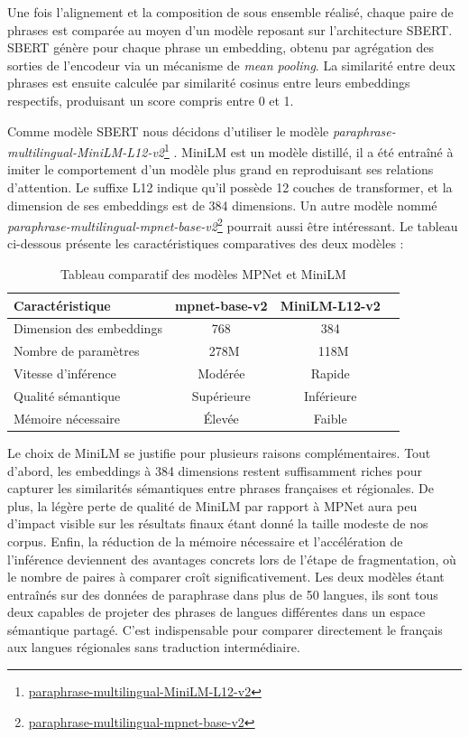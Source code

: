 Une fois l’alignement et la composition de sous ensemble réalisé, chaque paire de phrases est comparée au moyen d’un modèle reposant sur
l’architecture SBERT\citep{reimers_2019}. SBERT génère pour chaque phrase un embedding, obtenu
par agrégation des sorties de l'encodeur via un mécanisme de \textit{mean pooling}. La similarité entre
deux phrases est ensuite calculée par similarité cosinus entre leurs embeddings respectifs,
produisant un score compris entre 0 et 1.

Comme modèle SBERT nous décidons d'utiliser le modèle 
\textit{paraphrase-multilingual-MiniLM-L12-v2}\footnote{\href{https://huggingface.co/sentence-transformers/paraphrase-multilingual-MiniLM-L12-v2}{paraphrase-multilingual-MiniLM-L12-v2}} \citep{reimers_2019}.
MiniLM est un modèle distillé, il a été entraîné à imiter le comportement d'un modèle plus grand en 
reproduisant ses relations d'attention. Le suffixe L12 indique qu'il possède 12 couches de
transformer, et la dimension de ses embeddings est de 384 dimensions. Un autre modèle nommé 
\textit{paraphrase-multilingual-mpnet-base-v2}\footnote{\href{https://huggingface.co/sentence-transformers/paraphrase-multilingual-mpnet-base-v2}{paraphrase-multilingual-mpnet-base-v2}} \citep{reimers_2019}
pourrait aussi être intéressant. Le tableau ci-dessous présente les caractéristiques comparatives des deux modèles{ :}

\begin{table}[h!]
\centering
\begin{tabular}{lccc}
\hline
\textbf{Caractéristique} & \textbf{mpnet-base-v2} & \textbf{MiniLM-L12-v2} \\
\hline
Dimension des embeddings & 768 & 384 \\
Nombre de paramètres & ~278M & ~118M \\
Vitesse d'inférence & Modérée & Rapide \\
Qualité sémantique & Supérieure & Inférieure \\
Mémoire nécessaire & Élevée & Faible \\
\hline
\end{tabular}
\caption{Tableau comparatif des modèles MPNet et MiniLM}
\end{table}

Le choix de MiniLM se justifie pour plusieurs raisons complémentaires. Tout d'abord,
les embeddings à 384 dimensions restent suffisamment riches pour capturer les similarités sémantiques
entre phrases françaises et régionales. De plus, la légère perte de qualité de MiniLM par rapport à MPNet
aura peu d'impact visible sur les résultats finaux étant donné la taille modeste de nos corpus.
Enfin, la réduction de la mémoire nécessaire et l'accélération de l'inférence deviennent des avantages
concrets lors de l'étape de fragmentation, où le nombre de paires à comparer croît significativement.
Les deux modèles étant entraînés sur des données de paraphrase dans plus de 50 langues,
ils sont tous deux capables de projeter des phrases de langues différentes dans un espace sémantique partagé.
C'est indispensable pour comparer directement le français aux langues régionales sans traduction
intermédiaire.

